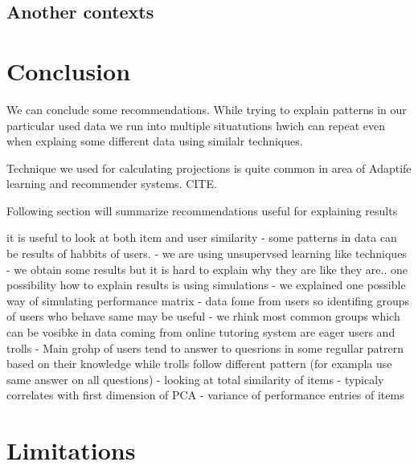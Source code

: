 \documentclass[
  digital, %
  table,   %
  nolof,     %
  nolot,     %
  nocover
]{fithesis3}
\begin{document}
\subsection{Another contexts}\label{another-contexts}



\section{Conclusion}\label{conclusion}


We can conclude some recommendations. While trying to explain patterns
in our particular used data we run into multiple situatutions hwich can
repeat even when explaing some different data using similalr techniques.

Technique we used for calculating projections is quite common in area of
Adaptife learning and recommender systems. CITE.


Following section will summarize recommendations useful for explaining
results

it is useful to look at both item and user similarity - some
patterns in data can be results of habbits of users. - we are using
unsupervsed learning like techniques - we obtain some results but it is
hard to explain why they are like they are.. one possibility how to
explain results is using simulations - we explained one possible way of
simulating performance matrix - data fome from users so identifing
groups of users who behave same may be useful - we rhink most common
groups which can be vosibke in data coming from online tutoring system
are eager users and trolls - Main grohp of users tend to answer to
quesrions in some regullar patrern based on their knowledge while trolls
follow different pattern (for exampla use same answer on all questions)
- looking at total similarity of items - typicaly correlates with first
dimension of PCA - variance of performance entries of items



\section{Limitations}\label{limitations}
\end{document}
